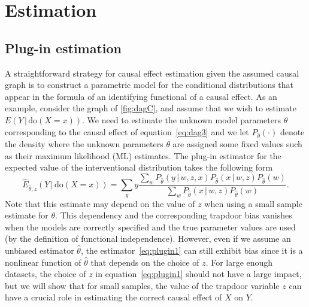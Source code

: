 \documentclass[11pt,a4paper,twoside]{article}
\newcommand{\+}[1]{\ensuremath{\mathbf{#1}}}
\newcommand{\doo}{\textrm{do}}
\newcommand{\given}{{ \, | \, }}
\newcommand{\z}{trapdoor variable}
\begin{document}
\section{Estimation}
\label{sec:estimation}

	\subsection{Plug-in estimation}\label{sec:plugin}
	A straightforward strategy for causal effect estimation given the assumed causal graph is to construct a parametric model for the conditional distributions that appear in the formula of an identifying functional of a causal effect. As an example, consider the graph of \autoref{fig:dagC}, and assume that we wish to estimate $E(Y \given \doo(X = x))$. We need to estimate the unknown model parameters $\theta$ corresponding to the causal effect of equation~\eqref{eq:dag3} and we let $P_{\hat\theta}(\cdot)$ denote the density where the unknown parameters $\theta$ are assigned some fixed values such as their maximum likelihood (ML) estimates. The plug-in estimator for the expected value of the interventional distribution takes the following form 
	\begin{equation} 
	\label{eq:plugin1}
	\widehat E_{\hat \theta, z}(Y \given \doo(X = x)) = \sum_{y} y \frac{\sum_{w}P_{\hat \theta}(y \given w, z, x)P_{\hat \theta}(x \given  w, z) P_{\hat \theta}(w)}{\sum_{w}P_{\hat \theta}(x \given  w, z) P_{\hat \theta}(w)}.
	\end{equation}
	Note that this estimate may depend on the value of $z$ when using a small sample estimate for $\theta$. This dependency and the corresponding trapdoor bias vanishes when the models are correctly specified and the true parameter values are used (by the definition of functional independence). However, even if we assume an unbiased estimator $\hat \theta$, the estimator~\eqref{eq:plugin1} can still exhibit bias since it is a nonlinear function of $\hat \theta$ that depends on the choice of $z$. For large enough datasets, the choice of $z$ in equation~\eqref{eq:plugin1} should not have a large impact, but we will show that for small samples, the value of the \z{} $z$ can have a crucial role in estimating the correct causal effect of $X$ on $Y$. 
	
\end{document}
